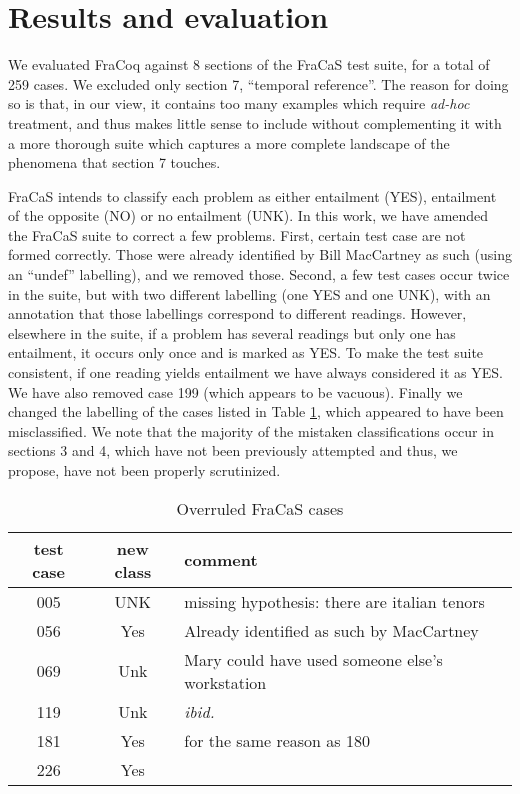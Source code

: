 \documentclass[11pt]{article}
\begin{document}
\section{Results and evaluation}

We evaluated FraCoq against 8 sections of the FraCaS test suite, for a
total of 259 cases. We excluded only section 7, ``temporal reference''. The reason for
doing so is that, in our view, it contains too many examples which
require \textit{ad-hoc} treatment, and thus makes little sense to
include without complementing it with a more thorough suite which
captures a more complete landscape of the phenomena that section 7
touches.

FraCaS intends to classify each problem as either entailment (YES),
entailment of the opposite (NO) or no entailment (UNK).  In this work,
we have amended the FraCaS suite to correct a few problems. First,
certain test case are not formed correctly. Those were already
identified by Bill MacCartney as such (using an ``undef''
labelling), and we removed those. Second, a few test cases occur twice
in the suite, but with two different labelling (one YES and one UNK),
with an annotation that those labellings correspond to different
readings. However, elsewhere in the suite, if a problem has several
readings but only one has entailment, it occurs only once and is
marked as YES. To make the test suite consistent, if one reading
yields entailment we have always considered it as YES. We have also
removed case 199 (which appears to be vacuous). Finally we changed the
labelling of the cases listed in Table \ref{tab:overrulings}, which appeared to have been
misclassified. We note that the majority of the mistaken
classifications occur in sections 3 and 4, which have not been
previously attempted and thus, we propose, have not been properly
scrutinized.
\begin{table}
  \centering
  \small
\begin{tabularx}{\columnwidth}{ccp{3.8cm}}
 test case & new class & comment \\ \hline
    005 & UNK & missing hypothesis: there are italian tenors \\
   056 &  Yes & Already identified as such by MacCartney \\
  069 & Unk & Mary could have used someone else's workstation \\
  119 & Unk & \textit{ibid.} \\
  181 & Yes & for the same reason as 180 \\
  226 & Yes &
\end{tabularx}
  \caption{Overruled FraCaS cases}
  \label{tab:overrulings}
\end{table}
\end{document}
